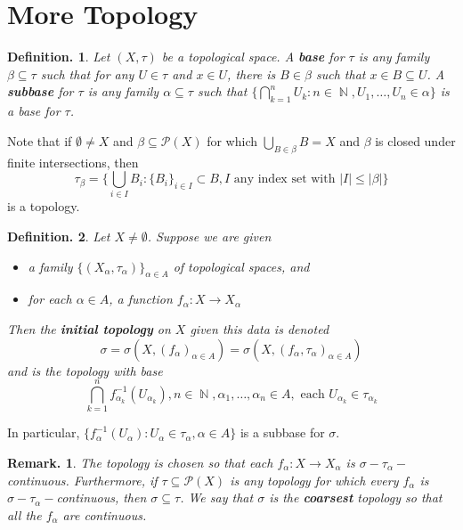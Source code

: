 \documentclass[11pt, a4paper]{memoir}
\DeclareMathOperator{\N}{{\mathbb{N}}}
\theoremstyle{change}
\theoremstyle{plain}
\theoremstyle{nonumberplain}
\newtheorem{definition}{Definition.}
\newtheorem{remark}{Remark.}
\numberwithin{equation}{section}
\begin{document}
\section{More Topology}
\begin{definition}
    Let $(X,\tau)$ be a topological space.
    A \textbf{base} for $\tau$ is any family $\beta\subseteq\tau$ such that for any $U\in\tau$ and $x\in U$, there is $B\in\beta$ such that $x\in B\subseteq U$.
    A \textbf{subbase} for $\tau$ is any family $\alpha\subseteq\tau$ such that $\{\bigcap_{k=1}^n U_k:n\in\N,U_1,\ldots,U_n\in\alpha\}$ is a base for $\tau$.
\end{definition}
Note that if $\emptyset\neq X$ and $\beta\subseteq\mathcal{P}(X)$ for which $\bigcup_{B\in \beta}B=X$ and $\beta$ is closed under finite intersections, then
\begin{equation*}
    \tau_\beta=\{\bigcup_{i\in I}B_i:\{B_i\}_{i\in I}\subset B,I\text{ any index set with }|I|\leq|\beta|\}
\end{equation*}
is a topology.
\begin{definition}
    Let $X\neq\emptyset$.
    Suppose we are given
    \begin{itemize}[nl]
        \item a family $\{(X_\alpha,\tau_\alpha)\}_{\alpha\in A}$ of topological spaces, and
        \item for each $\alpha\in A$, a function $f_\alpha:X\to X_\alpha$
    \end{itemize}
    Then the \textbf{initial topology} on $X$ given this data is denoted
    \begin{equation*}
        \sigma=\sigma(X,(f_\alpha)_{\alpha\in A})=\sigma(X,(f_\alpha,\tau_\alpha)_{\alpha\in A})
    \end{equation*}
    and is the topology with base
    \begin{equation*}
        \bigcap_{k=1}^n f_{\alpha_k}^{-1}(U_{\alpha_k}),n\in\N,\alpha_1,\ldots,\alpha_n\in A,\text{ each }U_{\alpha_k}\in\tau_{\alpha_k}
    \end{equation*}
\end{definition}
In particular, $\{f_\alpha^{-1}(U_\alpha):U_\alpha\in\tau_\alpha,\alpha\in A\}$ is a subbase for $\sigma$.
\begin{remark}
    The topology is chosen so that each $f_\alpha:X\to X_\alpha$ is $\sigma-\tau_\alpha-$continuous.
    Furthermore, if $\tau\subseteq\mathcal{P}(X)$ is any topology for which every $f_\alpha$ is $\sigma-\tau_\alpha-$continuous, then $\sigma\subseteq\tau$.
    We say that $\sigma$ is the \textbf{coarsest} topology so that all the $f_\alpha$ are continuous.
\end{remark}
\end{document}
